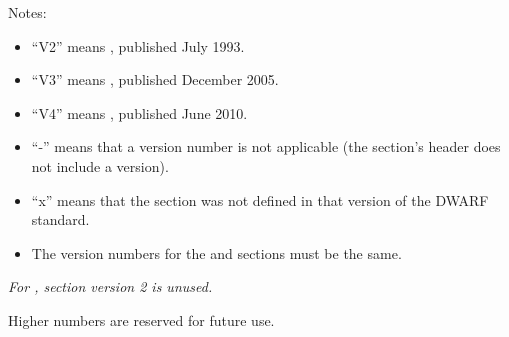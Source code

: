 Notes:

\begin{itemize}
\item  ``V2'' means , published July 1993.
\item  ``V3'' means , published December 2005.
\item  ``V4'' means , published June 2010.
\item  ``-'' means that a version number is not applicable
(the section's header does not include a version).

\item  ``x'' means that the section was not defined in that
version of the DWARF standard.

\item  The version numbers for the  and 
sections must be the same.

\end{itemize}

\textit{For , section version 2 is unused.}

Higher numbers are reserved for future use.

